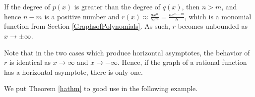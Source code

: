 If the degree of $p(x)$ is greater than the degree of $q(x)$, then $n > m$, and hence $n-m$ is a positive number and $r(x) \approx  \frac{ax^n}{bx^m}  = \frac{ax^{n-m}}{ b}$, which is a monomial function from Section \ref{GraphsofPolynomials}.  As such, $r$ becomes unbounded as $x \rightarrow \pm \infty$.

Note that in the two cases which produce horizontal asymptotes, the behavior of $r$ is identical as $x \rightarrow \infty$ and $x \rightarrow -\infty$.  Hence, if the graph of a rational function has a horizontal asymptote, there is only one. 

We put Theorem \ref{hathm}  to good use in the following example.
 

